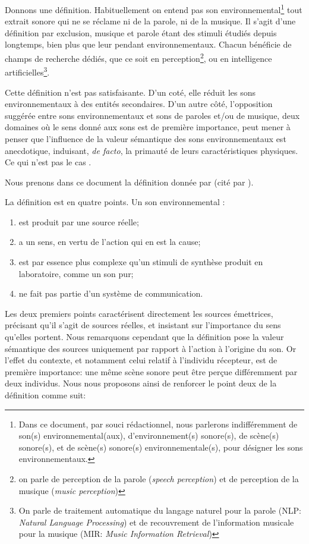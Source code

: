 Donnons une définition. Habituellement on entend pas son environnemental\footnote{Dans ce document, par souci rédactionnel, nous parlerons indifféremment de son(s) environnemental(aux), d'environnement(s) sonore(s), de scène(s) sonore(s), et de scène(s) sonore(s) environnementale(s), pour désigner les sons environnementaux.} tout extrait sonore qui ne se réclame ni de la parole, ni de la musique. Il s'agit d'une définition par exclusion, musique et parole étant des stimuli étudiés depuis longtemps, bien plus que leur pendant environnementaux. Chacun bénéficie de champs de recherche dédiés, que ce soit en perception\footnote{on parle de perception de la parole (\emph{speech perception}) et de perception de la musique (\emph{music perception})}, ou en intelligence artificielles\footnote{On parle de traitement automatique du langage naturel pour la parole (NLP: \emph{Natural Language Processing}) et de recouvrement de l'information musicale pour la musique (MIR: \emph{Music Information Retrieval})}.

Cette définition n'est pas satisfaisante. D'un coté, elle réduit les sons environnementaux à des entités secondaires. D'un autre côté, l'opposition suggérée entre sons environnementaux et sons de paroles et/ou de musique, deux domaines où le sens donné aux sons est de première importance, peut mener à penser que l'influence de la valeur sémantique des sons environnementaux est anecdotique, induisant, \emph{de facto}, la primauté de leurs caractéristiques physiques. Ce qui n'est pas le cas \citep{ballas1987interpreting}. 

Nous prenons dans ce document la définition donnée par \cite{vanderveer1980ecological} (cité par \cite{ballas1987interpreting}).

La définition est en quatre points. Un son environnemental :

\begin{enumerate}
\item est produit par une source réelle;
\item a un sens, en vertu de l'action qui en est la cause;
\item est par essence plus complexe qu'un stimuli de synthèse produit en laboratoire, comme un son pur;
\item ne fait pas partie d'un système de communication.
\end{enumerate} 

Les deux premiers points caractérisent directement les sources émettrices, précisant qu'il s'agit de sources réelles, et insistant sur l'importance du sens qu'elles portent. Nous remarquons cependant que la définition pose la valeur sémantique des sources uniquement par rapport à l'action à l'origine du son. Or l'effet du contexte, et notamment celui relatif à l'individu récepteur, est de première importance: une même scène sonore peut être perçue différemment par deux individus. Nous nous proposons ainsi de renforcer le point deux de la définition comme suit:

